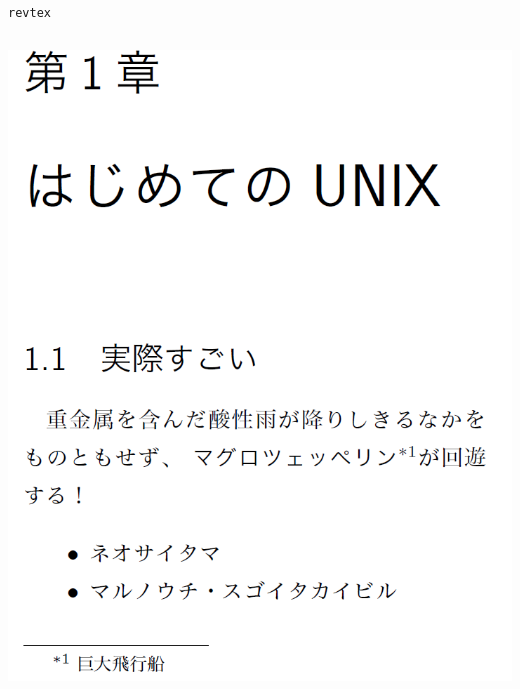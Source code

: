 \documentclass[14pt,dvipdfmx,uplatex]{beamer}
\begin{document}
\begin{frame}[t]{\inhibitglue \texttt{revtex}}
\begin{center}
\begin{columns}[c]
\begin{column}{.3\textwidth}
      \includegraphics[width=\textwidth]{figures/revtex-output.png}
      \end{column}
    \end{columns}
  \end{center}
\end{frame}
\end{document}
